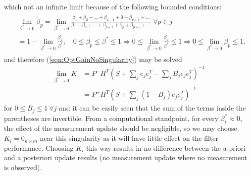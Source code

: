 \documentclass[10pt]{article}
\newcommand{\refeqn}[1]{(\ref{eqn:#1})}
\theoremstyle{plain}\theorembodyfont{\normalfont}
\begin{document}
which not an infinite limit because of the following bounded conditions:
\begin{align}
\begin{split}
&\lim_{\beta^* \to 0}\tilde\beta_p=\lim_{\beta^* \to 0}\frac{\beta_1+\beta_2+...+\beta_{p-1}+0+\beta_{p+1}+...}{\beta_1+\beta_2+...+\beta_{p-1}+\beta_p+\beta_{p+1}+...}\ \forall p\in j
\\
&=1-\lim_{\beta^* \to 0}\frac{\beta_p}{\beta^*},\quad 0\leq\beta_p\leq\beta^*\leq1\Rightarrow0\leq\lim_{\beta^* \to 0}\frac{\beta_p}{\beta^*}\leq1\Rightarrow0\leq\lim_{\beta^* \to 0}\tilde\beta_p\leq1.
\end{split}
\end{align}
and therefore \refeqn{OptGainNoSingularity} may be solved
\begin{align}
\lim_{\beta^* \to 0}K&=P^-H^T
\left(S+\sum\limits_{j}e_{j}e_{j}^T-\sum\limits_{j}{B_j}e_{j}e_{j}^T\right)^{-1}
\\
&=P^-H^T
\left(S+\sum\limits_{j}(1-B_j)e_{j}e_{j}^T\right)^{-1}
\label{eqn:OptGainNoSingularitySolved}
\end{align}
for $0\leq B_j\leq1\ \forall j$ and it can be easily seen that the sum of the terms inside the parentheses are invertible.
From a computational standpoint, for every $\beta^*_i\approx0$, the effect of the measurement update should be negligible, so we may choose $K_i=0_{n\times m}$ near this singularity as it will have little effect on the filter performance. Choosing $K_i$ this way results in no difference between the a priori and a posteriori update results (no measurement update where no measurement is observed). 
\end{document}
